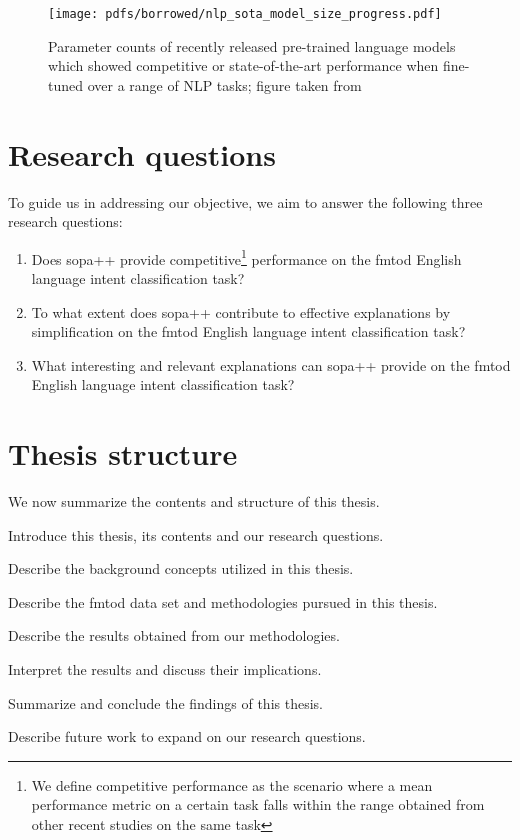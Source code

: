\begin{figure}[t!]
  \centering
  \texttt{[image: pdfs/borrowed/nlp\_sota\_model\_size\_progress.pdf]}
  \caption{Parameter counts of recently released pre-trained language models
    which showed competitive or state-of-the-art performance when fine-tuned
    over a range of NLP tasks; figure taken from \citet{sanh2019distilbert}}
  \label{fig:nlp_progress}
\end{figure}

\section{Research questions}

\label{section:rq}

To guide us in addressing our objective, we aim to answer the following three
research questions:

\begin{enumerate}
  \item Does \ac{sopa}++ provide competitive\footnote{We define
    competitive performance as the scenario where a mean performance metric on a
    certain task falls within the range obtained from other recent studies on
    the same task} performance on the \ac{fmtod} English language intent classification task?
  \item To what extent does \ac{sopa}++ contribute to effective explanations by
  simplification on the \ac{fmtod} English language intent classification task?
  \item What interesting and relevant explanations can \ac{sopa}++ provide on the
  \ac{fmtod} English language intent classification task?
\end{enumerate}

\section{Thesis structure}

We now summarize the contents and structure of this thesis.

\begin{description}[align=left]
  \item [Chapter \ref{chapter:introduction}:] Introduce this thesis, its
  contents and our research questions.
  \item [Chapter \ref{chapter:background}:] Describe the background concepts
  utilized in this thesis.
  \item [Chapter \ref{chapter:methodologies}:] Describe the \ac{fmtod} data set and
  methodologies pursued in this thesis.
  \item [Chapter \ref{chapter:results}:] Describe the results obtained from our
  methodologies.
  \item [Chapter \ref{chapter:discussion}:] Interpret the results and discuss their
  implications.
  \item [Chapter \ref{chapter:conclusions}:] Summarize and conclude the findings
  of this thesis.
  \item [Chapter \ref{chapter:further_work}:] Describe future work to expand on
  our research questions.
\end{description}


